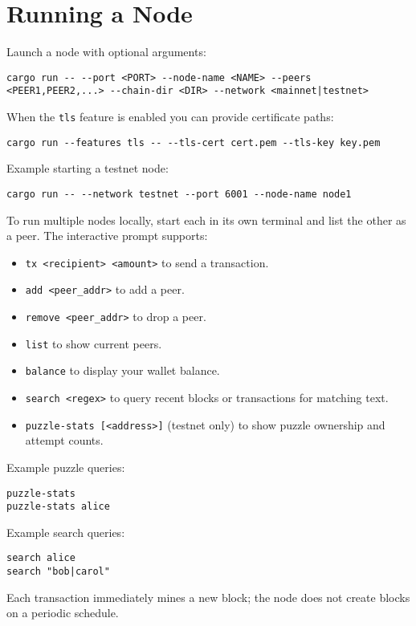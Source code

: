 \chapter{Running a Node}
Launch a node with optional arguments:
\begin{verbatim}
cargo run -- --port <PORT> --node-name <NAME> --peers <PEER1,PEER2,...> --chain-dir <DIR> --network <mainnet|testnet>
\end{verbatim}
When the \texttt{tls} feature is enabled you can provide certificate paths:
\begin{verbatim}
cargo run --features tls -- --tls-cert cert.pem --tls-key key.pem
\end{verbatim}
Example starting a testnet node:
\begin{verbatim}
cargo run -- --network testnet --port 6001 --node-name node1
\end{verbatim}
To run multiple nodes locally, start each in its own terminal and list the other as a peer. The interactive prompt supports:
\begin{itemize}
\item \texttt{tx <recipient> <amount>} to send a transaction.
\item \texttt{add <peer\_addr>} to add a peer.
\item \texttt{remove <peer\_addr>} to drop a peer.
\item \texttt{list} to show current peers.
\item \texttt{balance} to display your wallet balance.
\item \texttt{search <regex>} to query recent blocks or transactions for matching text.
\item \texttt{puzzle-stats [<address>]} (testnet only) to show puzzle ownership and attempt counts.
\end{itemize}
Example puzzle queries:
\begin{verbatim}
puzzle-stats
puzzle-stats alice
\end{verbatim}

Example search queries:
\begin{verbatim}
search alice
search "bob|carol"
\end{verbatim}

Each transaction immediately mines a new block; the node does not create blocks on a periodic schedule.
